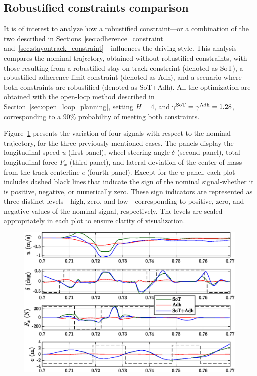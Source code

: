 \subsection{Robustified constraints comparison}
It is of interest to analyze how a robustified constraint---or a combination of the two described in Sections~\ref{sec:adherence_constraint} and~\ref{sec:stayontrack_constraint}---influences the driving style. This analysis compares the nominal trajectory, obtained without robustified constraints, with those resulting from a robustified stay-on-track constraint (denoted as SoT), a robustified adherence limit constraint (denoted as Adh), and a scenario where both constraints are robustified (denoted as SoT+Adh). All the optimization are obtained with the open-loop method described in Section~\ref{sec:open_loop_planning}, setting $H=4$, and $\gamma^\textrm{SoT}=\gamma^\textrm{Adh}=1.28$, corresponding to a 90\% probability of meeting both constraints. 

Figure~\ref{fig:ol_telemetries} presents the variation of four signals with respect to the nominal trajectory, for the three previously mentioned cases. The panels display the longitudinal speed $u$ (first panel), wheel steering angle $\delta$ (second panel), total longitudinal force $F_x$ (third panel), and lateral deviation of the center of mass from the track centerline $e$ (fourth panel). Except for the $u$ panel, each plot includes dashed black lines that indicate the sign of the nominal signal-whether it is positive, negative, or numerically zero. These sign indicators are represented as three distinct levels---high, zero, and low---corresponding to positive, zero, and negative values of the nominal signal, respectively. The levels are scaled appropriately in each plot to ensure clarity of visualization.

\begin{figure}
	\centering
	\includegraphics{Fig/ol_telemetries.eps}
	\caption{}
	\label{fig:ol_telemetries}
\end{figure}


